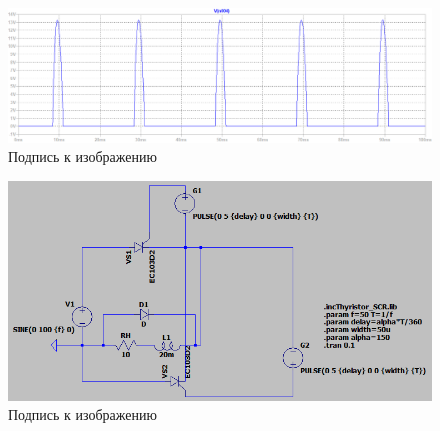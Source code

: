\documentclass[a4paper, 12pt]{article}
\begin{document}
    \begin{figure}[H]
        \centering
        \includegraphics[scale=0.45]{a150_L20m.png}
        \captionsetup{skip=0pt}
        \caption{Подпись к изображению}
        \label{fig:a150_L20m}
    \end{figure}


    \begin{figure}[H]
        \centering
        \includegraphics[scale=0.7]{scheme3.png}
        \captionsetup{skip=0pt}
        \caption{Подпись к изображению}
        \label{fig:scheme3}
    \end{figure}
\end{document}
